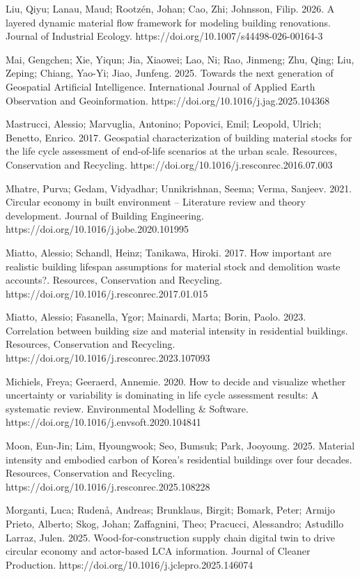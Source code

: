 Liu, Qiyu; Lanau, Maud; Rootzén, Johan; Cao, Zhi; Johnsson, Filip. 2026. A layered dynamic material flow framework for modeling building renovations. Journal of Industrial Ecology. https://doi.org/10.1007/s44498-026-00164-3

Mai, Gengchen; Xie, Yiqun; Jia, Xiaowei; Lao, Ni; Rao, Jinmeng; Zhu, Qing; Liu, Zeping; Chiang, Yao-Yi; Jiao, Junfeng. 2025. Towards the next generation of Geospatial Artificial Intelligence. International Journal of Applied Earth Observation and Geoinformation. https://doi.org/10.1016/j.jag.2025.104368

Mastrucci, Alessio; Marvuglia, Antonino; Popovici, Emil; Leopold, Ulrich; Benetto, Enrico. 2017. Geospatial characterization of building material stocks for the life cycle assessment of end-of-life scenarios at the urban scale. Resources, Conservation and Recycling. https://doi.org/10.1016/j.resconrec.2016.07.003

Mhatre, Purva; Gedam, Vidyadhar; Unnikrishnan, Seema; Verma, Sanjeev. 2021. Circular economy in built environment -- Literature review and theory development. Journal of Building Engineering. https://doi.org/10.1016/j.jobe.2020.101995

Miatto, Alessio; Schandl, Heinz; Tanikawa, Hiroki. 2017. How important are realistic building lifespan assumptions for material stock and demolition waste accounts?. Resources, Conservation and Recycling. https://doi.org/10.1016/j.resconrec.2017.01.015

Miatto, Alessio; Fasanella, Ygor; Mainardi, Marta; Borin, Paolo. 2023. Correlation between building size and material intensity in residential buildings. Resources, Conservation and Recycling. https://doi.org/10.1016/j.resconrec.2023.107093

Michiels, Freya; Geeraerd, Annemie. 2020. How to decide and visualize whether uncertainty or variability is dominating in life cycle assessment results: A systematic review. Environmental Modelling \& Software. https://doi.org/10.1016/j.envsoft.2020.104841

Moon, Eun-Jin; Lim, Hyoungwook; Seo, Bumsuk; Park, Jooyoung. 2025. Material intensity and embodied carbon of Korea's residential buildings over four decades. Resources, Conservation and Recycling. https://doi.org/10.1016/j.resconrec.2025.108228

Morganti, Luca; Rudenå, Andreas; Brunklaus, Birgit; Bomark, Peter; Armijo Prieto, Alberto; Skog, Johan; Zaffagnini, Theo; Pracucci, Alessandro; Astudillo Larraz, Julen. 2025. Wood-for-construction supply chain digital twin to drive circular economy and actor-based LCA information. Journal of Cleaner Production. https://doi.org/10.1016/j.jclepro.2025.146074

